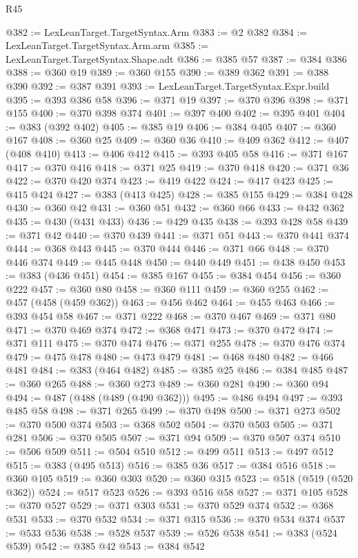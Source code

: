 \begin{lexlean}{R45}
\begin{coremodule}
@382 := LexLeanTarget.TargetSyntax.Arm
@383 := @2 @382
@384 := LexLeanTarget.TargetSyntax.Arm.arm
@385 := LexLeanTarget.TargetSyntax.Shape.adt
@386 := @385 @57
@387 := @384 @386
@388 := @360 @19
@389 := @360 @155
@390 := @389 @362
@391 := @388 @390
@392 := @387 @391
@393 := LexLeanTarget.TargetSyntax.Expr.build
@395 := @393 @386 @58
@396 := @371 @19
@397 := @370 @396
@398 := @371 @155
@400 := @370 @398 @374
@401 := @397 @400
@402 := @395 @401
@404 := @383 (@392 @402)
@405 := @385 @19
@406 := @384 @405
@407 := @360 @167
@408 := @360 @25
@409 := @360 @36
@410 := @409 @362
@412 := @407 (@408 @410)
@413 := @406 @412
@415 := @393 @405 @58
@416 := @371 @167
@417 := @370 @416
@418 := @371 @25
@419 := @370 @418
@420 := @371 @36
@422 := @370 @420 @374
@423 := @419 @422
@424 := @417 @423
@425 := @415 @424
@427 := @383 (@413 @425)
@428 := @385 @155
@429 := @384 @428
@430 := @360 @42
@431 := @360 @51
@432 := @360 @66
@433 := @432 @362
@435 := @430 (@431 @433)
@436 := @429 @435
@438 := @393 @428 @58
@439 := @371 @42
@440 := @370 @439
@441 := @371 @51
@443 := @370 @441 @374
@444 := @368 @443
@445 := @370 @444
@446 := @371 @66
@448 := @370 @446 @374
@449 := @445 @448
@450 := @440 @449
@451 := @438 @450
@453 := @383 (@436 @451)
@454 := @385 @167
@455 := @384 @454
@456 := @360 @222
@457 := @360 @80
@458 := @360 @111
@459 := @360 @255
@462 := @457 (@458 (@459 @362))
@463 := @456 @462
@464 := @455 @463
@466 := @393 @454 @58
@467 := @371 @222
@468 := @370 @467
@469 := @371 @80
@471 := @370 @469 @374
@472 := @368 @471
@473 := @370 @472
@474 := @371 @111
@475 := @370 @474
@476 := @371 @255
@478 := @370 @476 @374
@479 := @475 @478
@480 := @473 @479
@481 := @468 @480
@482 := @466 @481
@484 := @383 (@464 @482)
@485 := @385 @25
@486 := @384 @485
@487 := @360 @265
@488 := @360 @273
@489 := @360 @281
@490 := @360 @94
@494 := @487 (@488 (@489 (@490 @362)))
@495 := @486 @494
@497 := @393 @485 @58
@498 := @371 @265
@499 := @370 @498
@500 := @371 @273
@502 := @370 @500 @374
@503 := @368 @502
@504 := @370 @503
@505 := @371 @281
@506 := @370 @505
@507 := @371 @94
@509 := @370 @507 @374
@510 := @506 @509
@511 := @504 @510
@512 := @499 @511
@513 := @497 @512
@515 := @383 (@495 @513)
@516 := @385 @36
@517 := @384 @516
@518 := @360 @105
@519 := @360 @303
@520 := @360 @315
@523 := @518 (@519 (@520 @362))
@524 := @517 @523
@526 := @393 @516 @58
@527 := @371 @105
@528 := @370 @527
@529 := @371 @303
@531 := @370 @529 @374
@532 := @368 @531
@533 := @370 @532
@534 := @371 @315
@536 := @370 @534 @374
@537 := @533 @536
@538 := @528 @537
@539 := @526 @538
@541 := @383 (@524 @539)
@542 := @385 @42
@543 := @384 @542

\end{coremodule}
\end{lexlean}
